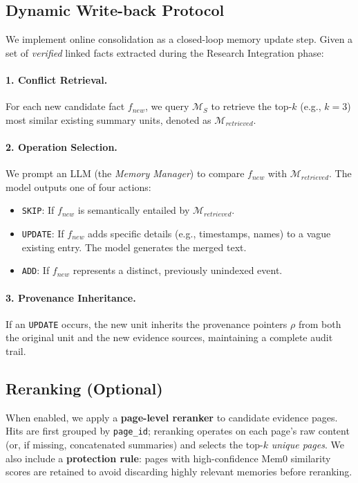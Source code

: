 \documentclass{article}
\theoremstyle{plain}
\theoremstyle{definition}
\theoremstyle{remark}
\newcommand{\Msum}{\mathcal{M}_S}        %
\begin{document}
\subsection{Dynamic Write-back Protocol}
\label{app:writeback}

We implement online consolidation as a closed-loop memory update step. Given a set of \emph{verified} linked facts extracted during the Research Integration phase:

\paragraph{1. Conflict Retrieval.}
For each new candidate fact $f_{new}$, we query $\Msum$ to retrieve the top-$k$ (e.g., $k=3$) most similar existing summary units, denoted as $\mathcal{M}_{retrieved}$.

\paragraph{2. Operation Selection.}
We prompt an LLM (the \textit{Memory Manager}) to compare $f_{new}$ with $\mathcal{M}_{retrieved}$. The model outputs one of four actions:
\begin{itemize}
    \item \texttt{SKIP}: If $f_{new}$ is semantically entailed by $\mathcal{M}_{retrieved}$.
    \item \texttt{UPDATE}: If $f_{new}$ adds specific details (e.g., timestamps, names) to a vague existing entry. The model generates the merged text.
    \item \texttt{ADD}: If $f_{new}$ represents a distinct, previously unindexed event.
\end{itemize}

\paragraph{3. Provenance Inheritance.}
If an \texttt{UPDATE} occurs, the new unit inherits the provenance pointers $\rho$ from both the original unit and the new evidence sources, maintaining a complete audit trail.
\subsection{Reranking (Optional)}
\label{app:reranking}
When enabled, we apply a \textbf{page-level reranker} to candidate evidence pages. Hits are first grouped by \texttt{page\_id}; reranking operates on each page's raw content (or, if missing, concatenated summaries) and selects the top-$k$ \emph{unique pages}. We also include a \textbf{protection rule}: pages with high-confidence Mem0 similarity scores are retained to avoid discarding highly relevant memories before reranking.
\end{document}
